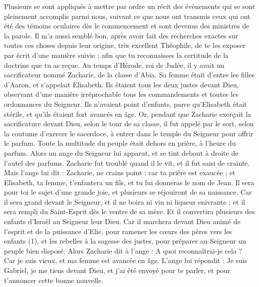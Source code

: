 \BFont
\begin{multicols}{2}
\VerseOne{}Plusieurs se sont appliqués à mettre par ordre un récit des évènements qui se sont pleinement accomplis parmi nous,
suivant ce que nous ont transmis ceux qui ont été des témoins oculaires dès le commencement et sont devenus des ministres de la parole.
Il m'a aussi semblé bon, après avoir fait des recherches exactes sur toutes ces choses depuis leur origine, très excellent Théophile, de te les exposer par écrit d’une manière suivie ;
afin que tu reconnaisses la certitude de la doctrine que tu as reçue.
Au temps d'Hérode, roi de Judée, il y avait un sacrificateur nommé Zacharie, de la classe d'Abia. Sa femme était d’entre les filles d'Aaron, et s’appelait Elisabeth.
Ils étaient tous les deux justes devant Dieu, observant d’une manière irréprochable tous les commandements et toutes les ordonnances du Seigneur.
Ils n'avaient point d'enfants, parce qu'Elisabeth était stérile, et qu'ils étaient fort avancés en âge.
Or, pendant que Zacharie exerçait la sacrificature devant Dieu, selon le tour de sa classe, il fut appelé par le sort,
selon la coutume d'exercer le sacerdoce, à entrer dans le temple du Seigneur pour offrir le parfum.
Toute la multitude du peuple était dehors en prière, à l'heure du parfum.
Alors un ange du Seigneur lui apparut, et se tint debout à droite de l'autel des parfums.
Zacharie fut troublé quand il le vit, et il fut saisi de crainte.
Mais l'ange lui dit : Zacharie, ne crains point ; car ta prière est exaucée ; et Elisabeth, ta femme, t’enfantera un fils, et tu lui donneras le nom de Jean.
Il sera pour toi le sujet d’une grande joie, et plusieurs se réjouiront de sa naissance.
Car il sera grand devant le Seigneur, et il ne boira ni vin ni liqueur enivrante ; et il sera rempli du Saint-Esprit dès le ventre de sa mère.
Et il convertira plusieurs des enfants d'Israël au Seigneur leur Dieu.
Car il marchera devant Dieu animé de l'esprit et de la puissance d'Elie, pour ramener les cœurs des pères vers les enfants (1), et les rebelles à la sagesse des justes, pour préparer au Seigneur un peuple bien disposé.
Alors Zacharie dit à l'ange : A quoi reconnaîtrai-je cela ? Car je suis vieux, et ma femme est avancée en âge.
L'ange lui répondit : Je suis Gabriel, je me tiens devant Dieu, et j’ai été envoyé pour te parler, et pour t'annoncer cette bonne nouvelle.

\end{multicols}

